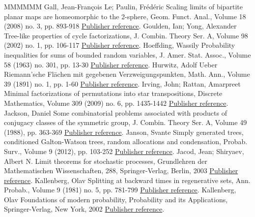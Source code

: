 \documentclass[11pt]{article}
\theoremstyle{definition}
\numberwithin{equation}{section}
\numberwithin{figure}{section}
\numberwithin{table}{section}
\begin{document}
\begin{thebibliography}{MMMMMM}
 Gall, Jean-François Le; Paulin, Frédéric Scaling limits of bipartite planar maps are homeomorphic to the 2-sphere, Geom. Funct. Anal., Volume 18 (2008) no. 3, pp. 893-918 \href{https://ahl.centre-mersenne.org/item/AHL_2018__1__149_0/#LGP08}{Publisher reference}.
 Goulden, Ian; Yong, Alexander Tree-like properties of cycle factorizations, J. Combin. Theory Ser. A, Volume 98 (2002) no. 1, pp. 106-117 \href{https://ahl.centre-mersenne.org/item/AHL_2018__1__149_0/#GY02}{Publisher reference}.
 Hoeffding, Wassily Probability inequalities for sums of bounded random variables, J. Amer. Stat. Assoc., Volume 58 (1963) no. 301, pp. 13-30 \href{https://ahl.centre-mersenne.org/item/AHL_2018__1__149_0/#Hoeffding}{Publisher reference}.
 Hurwitz, Adolf Ueber Riemann’sche Flächen mit gegebenen Verzweigungspunkten, Math. Ann., Volume 39 (1891) no. 1, pp. 1-60 \href{https://ahl.centre-mersenne.org/item/AHL_2018__1__149_0/#Hur91}{Publisher reference}.
 Irving, John; Rattan, Amarpreet Minimal factorizations of permutations into star transpositions, Discrete Mathematics, Volume 309 (2009) no. 6, pp. 1435-1442 \href{https://ahl.centre-mersenne.org/item/AHL_2018__1__149_0/#IrvingRattan2009}{Publisher reference}.
 Jackson, Daniel Some combinatorial problems associated with products of conjugacy classes of the symmetric group, J. Combin. Theory Ser. A, Volume 49 (1988), pp. 363-369 \href{https://ahl.centre-mersenne.org/item/AHL_2018__1__149_0/#Jac88}{Publisher reference}.
 Janson, Svante Simply generated trees, conditioned Galton-Watson trees, random allocations and condensation, Probab. Surv., Volume 9 (2012), pp. 103-252 \href{https://ahl.centre-mersenne.org/item/AHL_2018__1__149_0/#Jan12}{Publisher reference}.
 Jacod, Jean; Shiryaev, Albert N. Limit theorems for stochastic processes, Grundlehren der Mathematischen Wissenschaften, 288, Springer-Verlag, Berlin, 2003 \href{https://ahl.centre-mersenne.org/item/AHL_2018__1__149_0/#JS03}{Publisher reference}.
 Kallenberg, Olav Splitting at backward times in regenerative sets, Ann. Probab., Volume 9 (1981) no. 5, pp. 781-799 \href{https://ahl.centre-mersenne.org/item/AHL_2018__1__149_0/#Kal81}{Publisher reference}.
 Kallenberg, Olav Foundations of modern probability, Probability and its Applications, Springer-Verlag, New York, 2002 \href{https://ahl.centre-mersenne.org/item/AHL_2018__1__149_0/#Kal02}{Publisher reference}.

\end{thebibliography}
\end{document}
